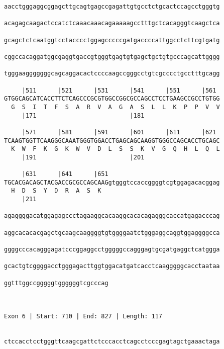 \documentclass{article}
\begin{document}
\begin{Verbatim}
aacctgggaggcggagcttgcagtgagccgagattgtgcctctgcactccagcctgggtg
                                                            
acagagcaagactccatctcaaacaaacagaaaaagcctttgctcacagggtcaagctca
                                                            
gcagctctcaatggtcctacccctggagcccccgatgaccccattggcctcttcgtgatg
                                                            
cggccacaggatggcgaggtgaccgtgggtgagtgtgagctgctgtgcccagcattgggg
                                                            
tgggaagggggggcagcaggacactccccaagccgggcctgtcgcccctgcctttgcagg
                                                            
     |511      |521      |531      |541      |551      |561 
GTGGCAGCATCACCTTCTCAGCCCGCGTGGCCGGCGCCAGCCTCCTGAAGCCGCCTGTGG
  G  S  I  T  F  S  A  R  V  A  G  A  S  L  L  K  P  P  V  V
     |171                          |181                     
  
     |571      |581      |591      |601      |611      |621 
TCAAGTGGTTCAAGGGCAAATGGGTGGACCTGAGCAGCAAGGTGGGCCAGCACCTGCAGC
  K  W  F  K  G  K  W  V  D  L  S  S  K  V  G  Q  H  L  Q  L
     |191                          |201                     
  
     |631      |641      |651                               
TGCACGACAGCTACGACCGCGCCAGCAAGgtgggtccaccggggtcgtggagacacggag
  H  D  S  Y  D  R  A  S  K                                 
     |211                                                   
  
agaggggacatggagagccctagaaggcacaaggcacacagagggcaccatgagacccag
                                                            
aggcacacacgagctgcaagcaaggggtgtggggaatctgggaggcaggtggaggggcca
                                                            
ggggcccacagggagatcccggaggcctgggggccagggagtgcgatgaggctcatggga
                                                            
gcactgtcggggacctgggagacttggtggacatgatcacctcaagggggcacctaataa
                                                            
ggtttggccgggggtggggggtcgcccag
                             
                             
 
Exon 6 | Start: 710 | End: 827 | Length: 117


ctccacctcctgggttcaagcgattctcccacctcagcctcccgagtagctgaaactaga
                                                            

\end{Verbatim}
\end{document}
